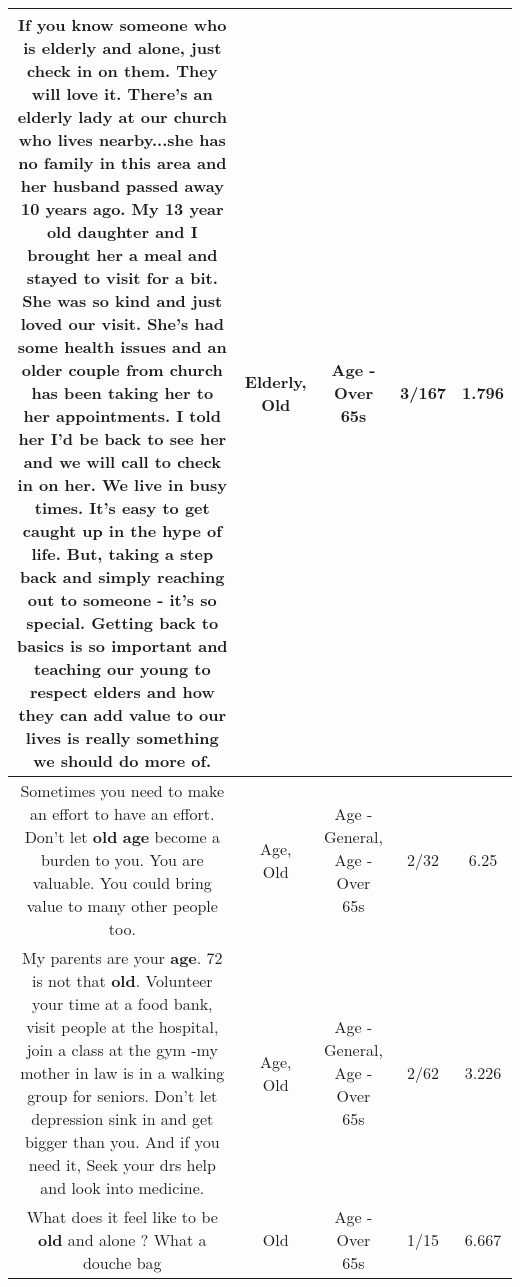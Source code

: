 \documentclass[11pt]{article}
\newlength\mylength
\begin{document}
\begin{center}
\begin{longtable}{|C{.65\mylength}|C{.30\mylength}|C{.12\mylength}|C{.12\mylength}|C{.12\mylength}|}
  \small If you know someone who is \textbf{elderly} and alone, just check in on them.  They will love it.   There's an \textbf{elderly} lady at our church who lives nearby...she has no family in this area and her husband passed away 10 years ago.  My 13 year \textbf{old} daughter and I brought her a meal and stayed to visit for a bit.   She was so kind and just loved our visit.   She's had some health issues and an older couple from church has been taking her to her appointments.  I told her I'd be back to see her and we will call to check in on her.   We live in busy times.   It's easy to get caught up in the hype of life.  But, taking a step back and simply reaching out to someone - it's so special.  Getting back to basics is so important and teaching our young to respect elders and how they can add value to our lives is really something we should do more of.\normalsize   & Elderly, Old & Age - Over 65s & 3/167 & 1.796 \\  \hline
  \small Sometimes you need to make an effort to have an effort.   Don't let \textbf{old} \textbf{age} become a burden to you.  You are valuable.  You could bring value to many other people too.\normalsize   & Age, Old & Age - General, Age - Over 65s & 2/32 & 6.25 \\  \hline
  \small My parents are your \textbf{age}.   72 is not that \textbf{old}.   Volunteer your time at a food bank, visit people at the hospital, join a class at the gym -my mother in law is in a walking group for seniors.  Don't let depression sink in and get bigger than you.  And if you need it, Seek your drs help and look into medicine.\normalsize   & Age, Old & Age - General, Age - Over 65s & 2/62 & 3.226 \\  \hline
  \small What does it feel like to be \textbf{old} and alone ? What a douche bag\normalsize   & Old & Age - Over 65s & 1/15 & 6.667 \\  \hline

\end{longtable}
\end{center}
\end{document}
